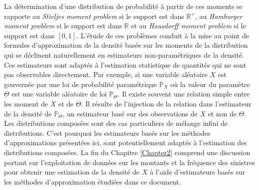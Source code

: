 La détermination d'une distribution de probabilité à partir de ces moments se rapporte au \textit{Stieljes moment problem} si le support est dans $\mathbb{R}^{+}$, au \textit{Hamburger moment problem} si le support est dans $\mathbb{R}$ et au \textit{Hausdorff moment problem} si le support est dans $[0,1]$. L'étude de ces problèmes conduit à la mise au point de formules d'approximation de la densité basée sur les moments de la distribution qui se déclinent naturellement en estimateurs non-paramétriques de la densité. Ces estimateurs sont adaptés à l'estimation statistique de quantités qui ne sont pas observables directement. Par exemple, si une variable aléatoire $X$ est gouvernée par une loi de probabilité paramétrique $\mathbb{P}_{X}$ où la valeur du paramètre $\Theta$ est une variable aléatoire de loi $\mathbb{P}_{\Theta}$. Il existe souvent une relation simple entre les moment de $X$ et de $\Theta$. Il résulte de l'injection de la relation dans l'estimateur de la densité de $\mathbb{P}_{\Theta}$, un estimateur basé sur des observations de $X$ et non de $\Theta$. Les distributions composées sont des cas particuliers de mélange infini de distributions. C\rq{}est pourquoi les estimateurs basés sur les méthodes d\rq{}approximations présentées ici, sont potentiellement adaptés à l\rq{}estimation des distributions composées. La fin du Chapitre \ref{Chapter2} comprend une discussion portant sur l\rq{}exploitation de données sur les montants et la fréquence des sinistres pour obtenir une estimation de la densité de $X$ à l\rq{}aide d\rq{}estimateurs basés sur les méthodes d\rq{}approximation étudiées dans ce document.

